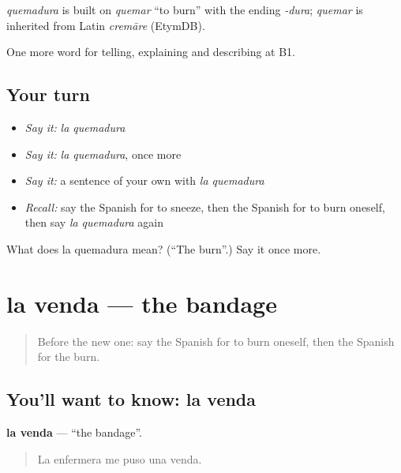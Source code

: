 \begin{cousinweb}
\emph{quemadura} is built on \emph{quemar} \textquotedblleft{}to burn\textquotedblright{} with the ending \emph{-dura}; \emph{quemar} is inherited from Latin \emph{cremāre} (EtymDB).
\end{cousinweb}

\begin{grammarlens}[title={What you've built}]
One more word for telling, explaining and describing at B1.
\end{grammarlens}

\subsection*{Your turn}
\begin{itemize}
\raggedright
  \item \emph{Say it:} \emph{la quemadura}
  \item \emph{Say it:} \emph{la quemadura}, once more
  \item \emph{Say it:} a sentence of your own with \emph{la quemadura}
  \item \emph{Recall:} say the Spanish for to sneeze, then the Spanish for to burn oneself, then say \emph{la quemadura} again
\end{itemize}

\begin{tcolorbox}[breakable,colback=teal!4,colframe=teal!35!black,title={Before you move on}]
What does la quemadura mean? (\textquotedblleft{}The burn\textquotedblright{}.) Say it once more.
\end{tcolorbox}
\section[la venda]{la venda — the bandage}

\label{lesson:ES-C734-venda}



\begin{quote}
Before the new one: say the Spanish for to burn oneself, then the Spanish for the burn.
\end{quote}

\subsection*{You'll want to know: la venda}
\textbf{la venda} — \textquotedblleft{}the bandage\textquotedblright{}.

\begin{quote}
La enfermera me puso una venda.
\end{quote}

